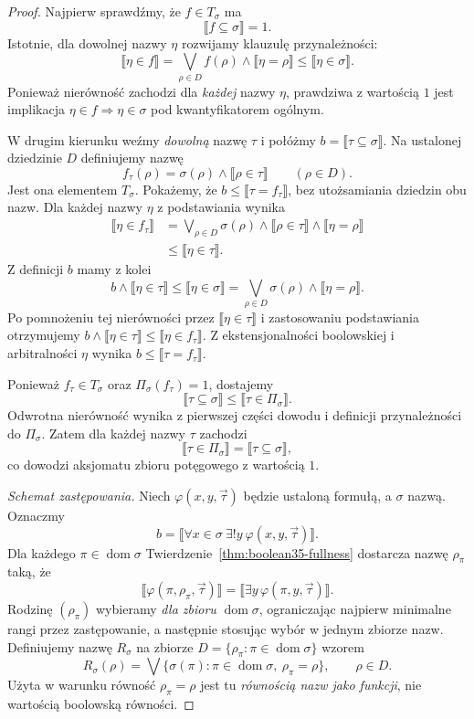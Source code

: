 \begin{proof}
Najpierw sprawdźmy, że
$f\in T_\sigma$ ma
\[
 \llbracket f\subseteq\sigma\rrbracket=1.
\]
Istotnie, dla dowolnej nazwy
$\eta$ rozwijamy klauzulę
przynależności:
\[
 \llbracket\eta\in f\rrbracket
 =\bigvee_{\rho\in D}
       f(\rho)\wedge
       \llbracket\eta=\rho\rrbracket
 \le\llbracket\eta\in\sigma\rrbracket.
\]
Ponieważ nierówność zachodzi
dla \emph{każdej} nazwy $\eta$,
prawdziwa z wartością $1$
jest implikacja
$\eta\in f\Longrightarrow\eta\in\sigma$
pod kwantyfikatorem ogólnym.

W drugim kierunku weźmy
\emph{dowolną} nazwę $\tau$
i połóżmy
$b=\llbracket\tau\subseteq\sigma\rrbracket$.
Na ustalonej dziedzinie $D$
definiujemy nazwę
\[
 f_\tau(\rho)=\sigma(\rho)\wedge
          \llbracket\rho\in\tau\rrbracket
      \qquad(\rho\in D).
\]
Jest ona elementem $T_\sigma$.
Pokażemy, że
$b\le\llbracket\tau=f_\tau\rrbracket$,
bez utożsamiania dziedzin
obu nazw. Dla każdej nazwy
$\eta$ z podstawiania wynika
\[
\begin{aligned}
 \llbracket\eta\in f_\tau\rrbracket
 &=\bigvee_{\rho\in D}
   \sigma(\rho)\wedge
   \llbracket\rho\in\tau\rrbracket
   \wedge\llbracket\eta=\rho\rrbracket\\
 &\le\llbracket\eta\in\tau\rrbracket.
\end{aligned}
\]
Z definicji $b$ mamy z kolei
\[
 b\wedge\llbracket\eta\in\tau\rrbracket
 \le\llbracket\eta\in\sigma\rrbracket
 =\bigvee_{\rho\in D}
   \sigma(\rho)\wedge
   \llbracket\eta=\rho\rrbracket.
\]
Po pomnożeniu tej nierówności
przez $\llbracket\eta\in\tau\rrbracket$
i zastosowaniu podstawiania
otrzymujemy
$b\wedge\llbracket\eta\in\tau\rrbracket
 \le\llbracket\eta\in f_\tau\rrbracket$.
Z ekstensjonalności boolowskiej
i arbitralności $\eta$
wynika
$b\le\llbracket\tau=f_\tau\rrbracket$.

Ponieważ $f_\tau\in T_\sigma$
oraz $\Pi_\sigma(f_\tau)=1$,
dostajemy
\[
 \llbracket\tau\subseteq\sigma\rrbracket
 \le\llbracket\tau\in\Pi_\sigma\rrbracket.
\]
Odwrotna nierówność
wynika z pierwszej części
dowodu i definicji przynależności
do $\Pi_\sigma$. Zatem dla
każdej nazwy $\tau$ zachodzi
\[
 \llbracket\tau\in\Pi_\sigma\rrbracket
 =\llbracket\tau\subseteq\sigma\rrbracket,
\]
co dowodzi aksjomatu zbioru
potęgowego z wartością $1$.

\emph{Schemat zastępowania.}
Niech $\varphi(x,y,\vec\tau)$
będzie ustaloną formułą, a
$\sigma$ nazwą. Oznaczmy
\[
 b=\llbracket
  \forall x\in\sigma\ \exists!y\
            \varphi(x,y,\vec\tau)\rrbracket.
\]
Dla każdego
$\pi\in\operatorname{dom}\sigma$
Twierdzenie~\ref{thm:boolean35-fullness}
dostarcza nazwę $\rho_\pi$
taką, że
\[
 \llbracket\varphi(\pi,\rho_\pi,\vec\tau)
 \rrbracket
 =\llbracket\exists y\,
              \varphi(\pi,y,\vec\tau)\rrbracket.
\]
Rodzinę $(\rho_\pi)$ wybieramy
\emph{dla zbioru}
$\operatorname{dom}\sigma$,
ograniczając najpierw minimalne
rangi przez zastępowanie,
a następnie stosując wybór
w jednym zbiorze nazw.
Definiujemy nazwę $R_\sigma$
na zbiorze
$D=\{\rho_\pi:\pi\in
              \operatorname{dom}\sigma\}$
wzorem
\[
 R_\sigma(\rho)=
  \bigvee\{\sigma(\pi):
       \pi\in\operatorname{dom}\sigma,\
       \rho_\pi=\rho\},
 \qquad \rho\in D.
\]
Użyta w warunku równość
$\rho_\pi=\rho$ jest tu
\emph{równością nazw jako funkcji},
nie wartością boolowską równości.


\end{proof}
